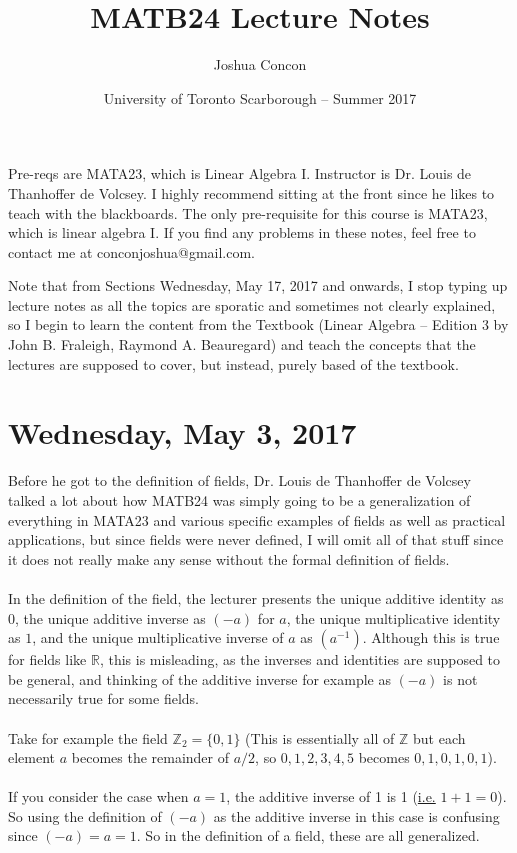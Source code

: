 \documentclass[12pt]{article}
\begin{document}
\title{MATB24 Lecture Notes}
\date{University of Toronto Scarborough -- Summer 2017}
\author{Joshua Concon}
\maketitle

Pre-reqs are MATA23, which is Linear Algebra I.
Instructor is Dr. Louis de Thanhoffer de Volcsey. I highly recommend sitting at the front since he likes to teach with the blackboards. The only pre-requisite for this course is MATA23, which is linear algebra I. If you find any problems in these notes, feel free to contact me at conconjoshua@gmail.com.

Note that from Sections Wednesday, May 17, 2017 and onwards, I stop typing up lecture notes as all the topics are sporatic and sometimes not clearly explained, so I begin to learn the content from the Textbook (Linear Algebra -- Edition 3
by John B. Fraleigh, Raymond A. Beauregard) and teach the concepts that the lectures are supposed to cover, but instead, purely based of the textbook.

\tableofcontents

\pagebreak

\section{Wednesday, May 3, 2017}

Before he got to the definition of fields, Dr. Louis de Thanhoffer de Volcsey talked a lot about how MATB24 was simply going to be a generalization of everything in MATA23 and various specific examples of fields as well as practical applications, but since fields were never defined, I will omit all of that stuff since it does not really make any sense without the formal definition of fields.\\
\\
In the definition of the field, the lecturer presents the unique additive identity as $0$, the unique additive inverse as $(-a)$ for $a$, the unique multiplicative identity as $1$, and the unique multiplicative inverse of $a$ as $(a^{-1})$. Although this is true for fields like $\mathbb{R}$, this is misleading, as the inverses and identities are supposed to be general, and thinking of the additive inverse for example as $(-a)$ is not necessarily true for some fields.\\
\\
Take for example the field $\mathbb{Z}_2 = \{ 0,1 \}$ (This is essentially all of $\mathbb{Z}$ but each element $a$ becomes the remainder of $a/2$, so $0,1,2,3,4,5$ becomes $0,1,0,1,0,1$).\\
\\
If you consider the case when $a = 1$, the additive inverse of 1 is 1 (\underline{i.e.} $1 + 1 = 0$). So using the definition of $(-a)$ as the additive inverse in this case is confusing since $(-a) = a = 1$. So in the definition of a field, these are all generalized.
\end{document}
